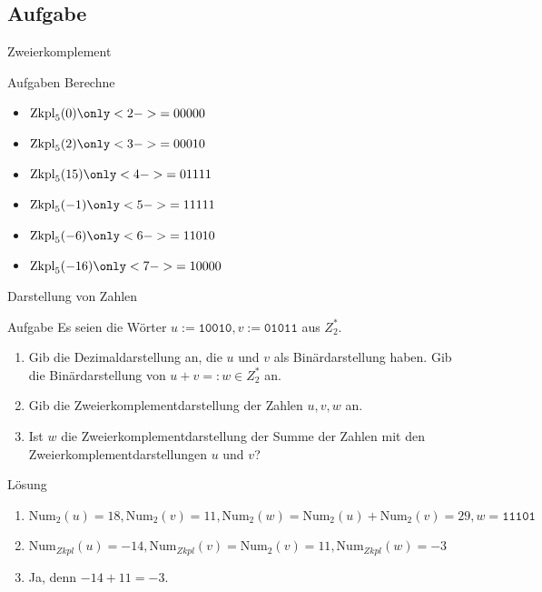 \subsection{Aufgabe}
\begin{frame}{Zweierkomplement}
	\begin{exampleblock}{Aufgaben}
	Berechne
		\begin{itemize}
			\item $\text{Zkpl}_5(0) \only<2->{= 00000}$ \\
			\item $\text{Zkpl}_5(2) \only<3->{= 00010}$ \\
			\item $\text{Zkpl}_5(15) \only<4->{= 01111}$ \\
			\item $\text{Zkpl}_5(-1) \only<5->{= 11111} $\\
			\item $\text{Zkpl}_5(-6) \only<6->{= 11010} $\\
			\item $\text{Zkpl}_5(-16) \only<7->{= 10000}$
		\end{itemize}
	\end{exampleblock}
\end{frame}

\begin{frame}{Darstellung von Zahlen}
    \begin{exampleblock}{Aufgabe}
    	Es seien die Wörter $u := \texttt{10010}, v := \texttt{01011}$ aus $Z_2^*$.
    	\begin{enumerate}
     		\item Gib die Dezimaldarstellung an, die $u$ und $v$ als Binärdarstellung haben. Gib die Binärdarstellung von $u+v=:w \in Z_2^*$ an.
    		\item Gib die Zweierkomplementdarstellung der Zahlen $u, v, w$ an.
    		\item Ist $w$ die Zweierkomplementdarstellung der Summe der Zahlen mit den Zweierkomplementdarstellungen $u$ und $v$?
  		\end{enumerate}
    \end{exampleblock}
    \pause
    \begin{block}{Lösung}
    	\begin{enumerate}
     		\item $\text{Num}_2(u)=18, \text{Num}_2(v)=11, \text{Num}_2(w) = \text{Num}_2(u)+\text{Num}_2(v)=29, w=\texttt{11101}$
    		\pause \item $\text{Num}_{Zkpl}(u)=-14, \text{Num}_{Zkpl}(v)=\text{Num}_2(v)=11, \text{Num}_{Zkpl}(w)=-3$
    		\pause \item Ja, denn $-14+11=-3$.
  		\end{enumerate}
    \end{block}
\end{frame}


